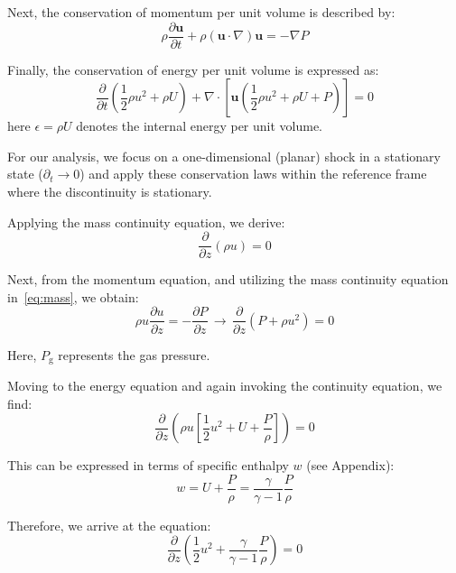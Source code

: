 Next, the conservation of momentum per unit volume is described by:
%
\begin{equation}
\rho \frac{\partial \mathbf{u}}{\partial t} + \rho (\mathbf{u} \cdot \nabla) \mathbf{u} = -\nabla P
\end{equation}

Finally, the conservation of energy per unit volume is expressed as:
%
\begin{equation}
\frac{\partial}{\partial t} \left( \frac{1}{2} \rho u^2 + \rho U \right) + \nabla \cdot \left[ \mathbf{u} \left( \frac{1}{2} \rho u^2 + \rho U + P \right) \right] = 0
\end{equation}
%
here \( \epsilon = \rho U \) denotes the internal energy per unit volume.

For our analysis, we focus on a one-dimensional (planar) shock in a stationary state (\( \partial_t \rightarrow 0 \)) and apply these conservation laws within the reference frame where the discontinuity is stationary.

Applying the mass continuity equation, we derive:
%
\begin{equation}\label{eq:mass}
\frac{\partial}{\partial z} (\rho u) = 0
\end{equation}

Next, from the momentum equation, and utilizing the mass continuity equation in~\ref{eq:mass}, we obtain:
%
\begin{equation}
\rho u \frac{\partial u}{\partial z} = -\frac{\partial P}{\partial z}  \, \rightarrow \, \frac{\partial}{\partial z} (P + \rho u^2) = 0 
\end{equation}

{\color{red}Here, \( P_{\text{g}} \) represents the gas pressure.}

Moving to the energy equation and again invoking the continuity equation, we find:
%
\begin{equation}
\frac{\partial}{\partial z} \left( \rho u \left[ \frac{1}{2} u^2 + U + \frac{P}{\rho} \right] \right) = 0 
\end{equation}

This can be expressed in terms of specific enthalpy \( w \) (see Appendix):
%
\begin{equation}
w = U + \frac{P}{\rho} = \frac{\gamma}{\gamma - 1}\frac{P}{\rho}
\end{equation}

Therefore, we arrive at the equation:
%
\begin{equation}
\frac{\partial}{\partial z} \left( \frac{1}{2} u^2 + \frac{\gamma}{\gamma - 1}\frac{P}{\rho} \right) = 0 
\end{equation}


